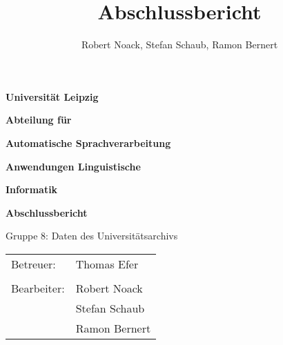 \documentclass[12pt,a4paper]{article}
\title{Abschlussbericht}
\author{Robert Noack, Stefan Schaub, Ramon Bernert}
\begin{document}
\thispagestyle{empty}


\begin{LARGE}
 \centering
 \vspace*{0.35cm} \textbf{Universität Leipzig}

 \vspace*{0.4cm}
 \textbf{Abteilung für}
 
 \textbf{Automatische Sprachverarbeitung}

 \vspace*{2cm}
 \textbf{Anwendungen Linguistische}

 \textbf{Informatik}

 \vspace*{0.8cm}
 \textbf{Abschlussbericht}

 \vspace*{1cm}
 \hspace*{0.8cm} Gruppe 8: Daten des Universitätsarchivs
\end{LARGE}

\vspace*{\fill}
\begin{large}
 \begin{tabular}{p{7cm} l}
  Betreuer:		& Thomas Efer	\\
\\
  Bearbeiter: 	& Robert Noack 	\\
				& Stefan Schaub \\
				& Ramon Bernert \\
 \end{tabular}
\end{large}


\newpage
\thispagestyle{empty}

\tableofcontents
{}


\newpage
\setcounter{page}{1}



%



\newpage
\end{document}
